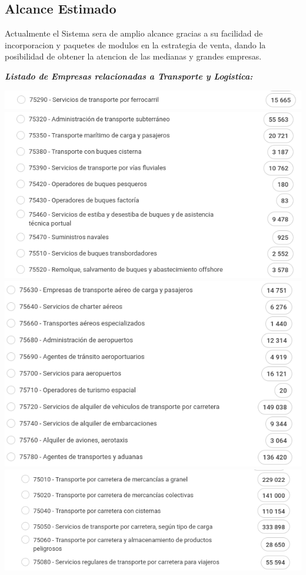 \documentclass[
10pt, %
a4paper, %
oneside, %
headinclude,footinclude, %
BCOR5mm, %
]{scrartcl}
\begin{document}
\subsection {Alcance Estimado}
  Actualmente el Sistema sera de amplio alcance gracias a su facilidad
  de incorporacion y paquetes de modulos en la estrategia de venta, dando
  la posibilidad de obtener la atencion de las medianas y grandes empresas.

\pagebreak
  \textbf {\emph{Listado de Empresas relacionadas a Transporte y Logistica:} }

  \begin{flushleft}
    \includegraphics[width=17cm, keepaspectratio]{images/list_1.png}
    \includegraphics[width=17cm, keepaspectratio]{images/list_2.png}
    \includegraphics[width=17cm, keepaspectratio]{images/list_3.png}
    \includegraphics[width=17cm, keepaspectratio]{images/list_4.png}
  \end{flushleft}
\end{document}
